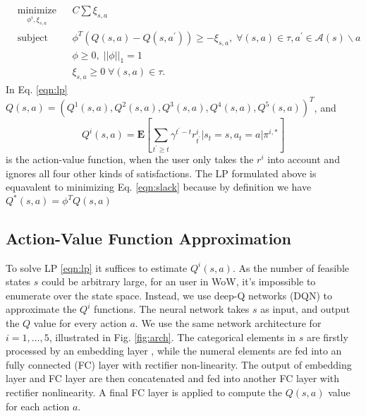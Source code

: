 \documentclass[a4paper]{article}
\begin{document}
\begin{equation}
\begin{aligned}
& \underset{\phi^i, \xi_{s,a}}{\text{minimize}}
& & C\sum \xi_{s,a} \\
& \text{subject to}
& & \phi^T(Q(s,a)-Q(s,a^\prime)) \geq - \xi_{s,a}, \; \forall (s,a) \in \tau, a^\prime \in \mathcal{A}(s)\backslash a \\
&&& \phi \geq 0, \; ||\phi||_1=1\\
&&& \xi_{s,a} \geq 0 \; \forall (s,a) \in \tau. 
\label{eqn:lp}
\end{aligned}
\end{equation}
In Eq. \eqref{eqn:lp} $Q(s,a)=(Q^1(s,a), Q^2(s,a), Q^3(s,a), Q^4(s,a), Q^5(s,a))^T$, and
\begin{equation}
Q^i(s,a)=\mathbf{E}[\sum_{t^\prime\geq t}\gamma^{t^\prime-t}r^i_{t^\prime} | s_{t}=s, a_{t}=a | \pi^{i,\ast}] \label{eqn:qi}
\end{equation}
is the action-value function, when the user only takes the $r^i$ into account and ignores all four other kinds of satisfactions. The LP formulated above is equavalent to minimizing Eq. \eqref{eqn:slack} because by definition we have $Q^*(s,a)=\phi^TQ(s,a)$

\subsection{Action-Value Function Approximation}

To solve LP \eqref{eqn:lp} it suffices to estimate $Q^i(s,a)$. As the number of feasible states $s$ could be arbitrary large, for an user in WoW, it's impossible to enumerate over the state space. Instead, we use deep-Q networks (DQN) \cite{} to approximate the $Q^i$ functions. The neural network takes $s$ as input, and output the $Q$ value for every action $a$. We use the same network architecture for $i=1,\dots,5$, illustrated in Fig. \ref{fig:arch}. The categorical elements in $s$ are firstly processed by an embedding layer \cite{}, while the numeral elements are fed into an fully connected (FC) layer with rectifier non-linearity. The output of embedding layer and FC layer are then concatenated and fed into another FC layer with rectifier nonlinearity. A final FC layer is applied to compute the $Q(s,a)$ value for each action $a$.
\end{document}
